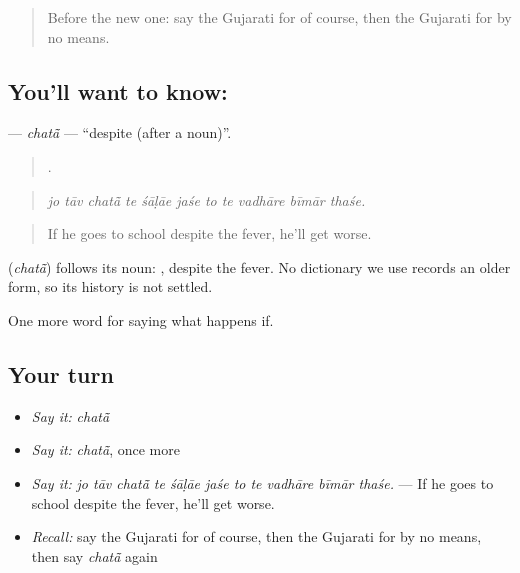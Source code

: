 \label{lesson:GU-C547-chata}



\begin{quote}
Before the new one: say the Gujarati for of course, then the Gujarati for by no means.
\end{quote}

\subsection*{You'll want to know: }
\textbf{} — \emph{chatā̃} — \textquotedblleft{}despite (after a noun)\textquotedblright{}.

\begin{quote}
          .
\end{quote}

\begin{quote}
\emph{jo tāv chatā̃ te śāḷāe jaśe to te vadhāre bīmār thaśe.}
\end{quote}

\begin{quote}
If he goes to school despite the fever, he'll get worse.
\end{quote}

\begin{cousinweb}
\textbf{} (\emph{chatā̃}) follows its noun: \textbf{ }, despite the fever. No dictionary we use records an older form, so its history is not settled.
\end{cousinweb}

\begin{grammarlens}[title={What you've built}]
One more word for saying what happens if.
\end{grammarlens}

\subsection*{Your turn}
\begin{itemize}
\raggedright
  \item \emph{Say it:} \emph{chatā̃}
  \item \emph{Say it:} \emph{chatā̃}, once more
  \item \emph{Say it:} \emph{jo tāv chatā̃ te śāḷāe jaśe to te vadhāre bīmār thaśe.} — If he goes to school despite the fever, he'll get worse.
  \item \emph{Recall:} say the Gujarati for of course, then the Gujarati for by no means, then say \emph{chatā̃} again
\end{itemize}

